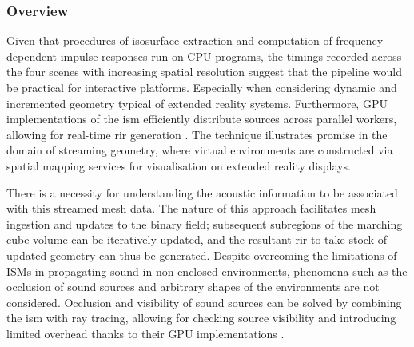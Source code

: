 \subsubsection{Overview}
Given that procedures of isosurface extraction and computation of frequency-dependent impulse responses run on CPU programs, the timings recorded across the four scenes with increasing spatial resolution suggest that the pipeline would be practical for interactive platforms. Especially when considering dynamic and incremented geometry typical of extended reality systems. Furthermore, GPU implementations of the \acrshort{ism} efficiently distribute sources across parallel workers, allowing for real-time \acrshort{rir} generation \citep{diaz2021gpurir}. The technique illustrates promise in the domain of streaming geometry, where virtual environments are constructed via spatial mapping services for visualisation on extended reality displays.\par
There is a necessity for understanding the acoustic information to be associated with this streamed mesh data. The nature of this approach facilitates mesh ingestion and updates to the binary field; subsequent subregions of the marching cube volume can be iteratively updated, and the resultant \acrshort{rir} to take stock of updated geometry can thus be generated. Despite overcoming the limitations of ISMs in propagating sound in non-enclosed environments, phenomena such as the occlusion of sound sources and arbitrary shapes of the environments are not considered. Occlusion and visibility of sound sources can be solved by combining the \acrshort{ism} with ray tracing, allowing for checking source visibility and introducing limited overhead thanks to their GPU implementations \citep{taylor2012guided}.\par

